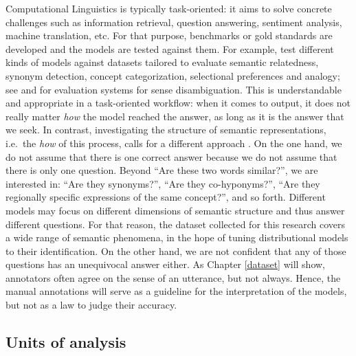 \documentclass[
]{book}
\begin{document}
Computational Linguistics is typically task-oriented: it aims to solve concrete challenges such as information retrieval, question answering, sentiment analysis, machine translation, etc. For that purpose, benchmarks or gold standards are developed and the models are tested against them. For example, \textcite{baroni.etal_2014} test different kinds of models against datasets tailored to evaluate semantic relatedness, synonym detection, concept categorization, selectional preferences and analogy; see \textcite{agirre.edmonds_2007a} and \textcite{raganato.etal_2017} for evaluation systems for sense disambiguation. This is understandable and appropriate in a task-oriented workflow: when it comes to output, it does not really matter \emph{how} the model reached the answer, as long as it is the answer that we seek. In contrast, investigating the structure of semantic representations, i.e.~the \emph{how} of this process, calls for a different approach \autocites[see for example][]{baroni.lenci_2011,wielfaert.etal_2019}. On the one hand, we do not assume that there is one correct answer because we do not assume that there is only one question. Beyond ``Are these two words similar?'', we are interested in: ``Are they synonyms?'', ``Are they co-hyponyms?'', ``Are they regionally specific expressions of the same concept?'', and so forth. Different models may focus on different dimensions of semantic structure and thus answer different questions. For that reason, the dataset collected for this research covers a wide range of semantic phenomena, in the hope of tuning distributional models to their identification. On the other hand, we are not confident that any of those questions has an unequivocal answer either. As Chapter \ref{dataset} will show, annotators often agree on the sense of an utterance, but not always. Hence, the manual annotations will serve as a guideline for the interpretation of the models, but not as a law to judge their accuracy.

\hypertarget{units-of-analysis}{%
\subsection{Units of analysis}\label{units-of-analysis}}
\end{document}
